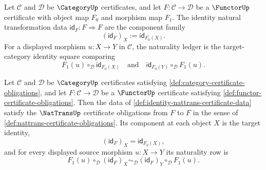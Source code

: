 \begin{definition}
\label{def:identity-nattrans-certificate-data}
Let $\mathcal C$ and $\mathcal D$ be $\CategoryUp$ certificates, and let $F:\mathcal C\to\mathcal D$ be a $\FunctorUp$ certificate with object map $F_0$ and morphism map $F_1$. The identity natural transformation data $\mathsf{id}_F:F\Rightarrow F$ are the component family
$$
(\mathsf{id}_F)_X:=\mathsf{id}_{F_0(X)}.
$$
For a displayed morphism $u:X\to Y$ in $\mathcal C$, the naturality ledger is the target-category identity square comparing
$$
F_1(u)\circ_{\mathcal D}\mathsf{id}_{F_0(X)}
\quad\text{and}\quad
\mathsf{id}_{F_0(Y)}\circ_{\mathcal D}F_1(u).
$$
\end{definition}

\begin{theorem}
\label{thm:identity-nattrans-certificate}
Let $\mathcal C$ and $\mathcal D$ be $\CategoryUp$ certificates satisfying \autoref{def:category-certificate-obligations}, and let $F:\mathcal C\to\mathcal D$ be a $\FunctorUp$ certificate satisfying \autoref{def:functor-certificate-obligations}. Then the data of \autoref{def:identity-nattrans-certificate-data} satisfy the $\NatTransUp$ certificate obligations from $F$ to $F$ in the sense of \autoref{def:nattrans-certificate-obligations}. Its component at each object $X$ is the target identity,
$$
(\mathsf{id}_F)_X=\mathsf{id}_{F_0(X)},
$$
and for every displayed source morphism $u:X\to Y$ its naturality row is
$$
F_1(u)\circ_{\mathcal D}(\mathsf{id}_F)_X
\sim_{\mathcal D}
(\mathsf{id}_F)_Y\circ_{\mathcal D}F_1(u).
$$
\end{theorem}
